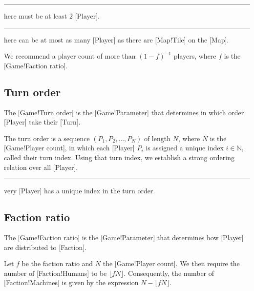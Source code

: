 \begin{rules}
    \rule{game.parameter.playercount.min} There must be at least \(2\) [Player].
    \rule{game.parameter.playercount.max} There can be at most as many [Player] as there are [Map!Tile] on the [Map].
\end{rules}

\begin{recommendations}
    \recommendation{} We recommend a player count of more than \({(1 - f)}^{-1}\) players, where \(f\) is the [Game!Faction ratio].
\end{recommendations}

\subsection{Turn order}

The [Game!Turn order] is the [Game!Parameter] that determines in which order [Player] take their [Turn].

The turn order is a sequence \((P_1, P_2, \ldots, P_N)\) of length \(N\), where \(N\) is the [Game!Player count], in which each [Player] \(P_i\) is assigned a unique index \(i \in \mathbb{N}\), called their turn index.
Using that turn index, we establish a strong ordering relation over all [Player].

\begin{rules}
    \rule{game.parameter.turnorder} Every [Player] has a unique index in the turn order.
\end{rules}

\subsection{Faction ratio}

The [Game!Faction ratio] is the [Game!Parameter] that determines how [Player] are distributed to [Faction].

Let \(f\) be the faction ratio and \(N\) the [Game!Player count].
We then require the number of [Faction!Humans] to be \(\lfloor fN \rfloor \).
Consequently, the number of [Faction!Machines] is given by the expression \(N - \lfloor fN \rfloor \).

